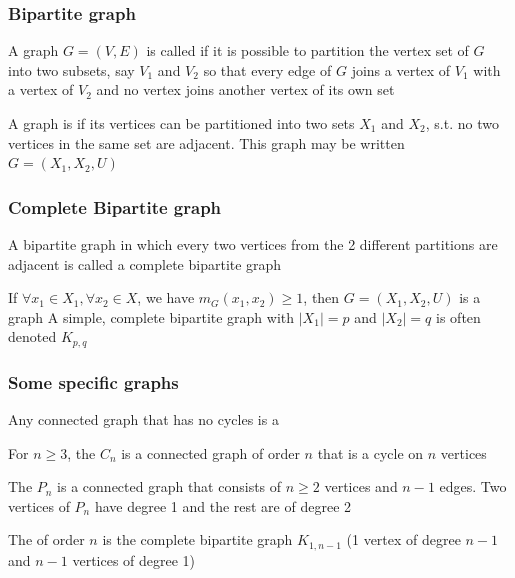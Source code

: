 \documentclass[aspectratio=43]{beamer}
\begin{document}
\begin{frame}\frametitle{Bipartite graph}
	\begin{definition}
		A graph $G=(V,E)$ is called  if it is possible to partition the vertex set of $G$ into two subsets, say $V_1$ and $V_2$ so that every edge of $G$ joins a vertex of $V_1$ with a vertex of $V_2$ and no vertex joins another vertex of its own set
	\end{definition}
	\vfill
	\begin{definition}
		A graph is  if its vertices can be partitioned into two sets $X_1$ and $X_2$, s.t. no two vertices in the same set are adjacent.
		This graph may be written $G=(X_1,X_2,U)$
	\end{definition}
\end{frame}


\begin{frame}\frametitle{Complete Bipartite graph}
	\begin{definition}
		A bipartite graph in which every two vertices from the 2 different partitions are adjacent is called a complete bipartite graph
	\end{definition}
	\vfill
	\begin{definition}
		If $\forall x_1\in X_1, \forall x_2\in X$, we have $m_G(x_1,x_2)\geq 1$, then $G=(X_1,X_2,U)$ is a  graph
		\vskip0.25cm
		A simple, complete bipartite graph with $|X_1|=p$ and $|X_2|=q$ is often denoted $K_{p,q}$
	\end{definition}
\end{frame}

\begin{frame}\frametitle{Some specific graphs}
	\begin{definition}[{Tree}]
		Any connected graph that has no cycles is a 
	\end{definition}
	\begin{definition}[{Cycle $C_n$}]
		For $n\geq 3$, the  $C_n$ is a connected graph of order $n$ that is a cycle on $n$ vertices
	\end{definition}
	\begin{definition}[{Path $P_n$}]
		The  $P_n$ is a connected graph that consists of $n\geq 2$ vertices and $n-1$ edges. Two vertices of $P_n$ have degree 1 and the rest are of degree 2
	\end{definition}
	\begin{definition}[{Star $S_n$}]
		The  of order $n$ is the complete bipartite graph $K_{1,n-1}$ (1 vertex of degree $n-1$ and $n-1$ vertices of degree 1)
	\end{definition}
\end{frame}
\end{document}
